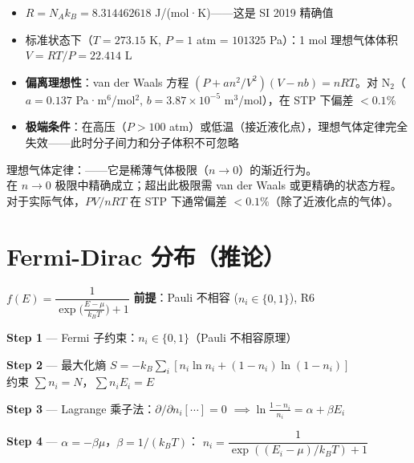 \begin{oombox}[理想气体的实际表现]
  \begin{itemize}
    \item $R = N_A k_B = 8.314462618$ J/(mol·K)——这是 SI 2019 精确值
    \item 标准状态下（$T=273.15$ K, $P=1$ atm = $101325$ Pa）：1 mol 理想气体体积 $V = RT/P = 22.414$ L
    \item \textbf{偏离理想性}：van der Waals 方程 $(P + a n^2/V^2)(V - nb) = nRT$。对 N$_2$（$a=0.137$ Pa·m$^6$/mol$^2$, $b=3.87\times10^{-5}$ m$^3$/mol），在 STP 下偏差 $<0.1\%$
    \item \textbf{极端条件}：在高压（$P > 100$ atm）或低温（接近液化点），理想气体定律完全失效——此时分子间力和分子体积不可忽略
  \end{itemize}
\end{oombox}

\precisionbox[精度等级]
  理想气体定律：\precisionapprox——它是稀薄气体极限（$n \to 0$）的渐近行为。\\
  在 $n \to 0$ 极限中精确成立；超出此极限需 van der Waals 或更精确的状态方程。\\
  对于实际气体，$PV/nRT$ 在 STP 下通常偏差 $< 0.1\%$（除了近液化点的气体）。
\endprecisionbox

\section{Fermi-Dirac 分布（推论）}

\begin{lawbox}
  $f(E) = \dfrac{1}{\exp\!\big(\frac{E-\mu}{k_B T}\big) + 1}$
  \quad\textbf{前提}：Pauli 不相容 ($n_i \in \{0,1\}$), R6
\end{lawbox}

\begin{derivationbox}[推导]
  \textbf{Step 1} — Fermi 子约束：$n_i \in \{0,1\}$（Pauli 不相容原理）

  \textbf{Step 2} — 最大化熵 $S = -k_B\sum_i[n_i\ln n_i + (1-n_i)\ln(1-n_i)]$\\
  约束 $\sum n_i = N$，$\sum n_i E_i = E$

  \textbf{Step 3} — Lagrange 乘子法：$\partial/\partial n_i[\cdots] = 0$
  $\implies \ln\frac{1-n_i}{n_i} = \alpha + \beta E_i$

  \textbf{Step 4} — $\alpha = -\beta\mu$，$\beta = 1/(k_B T)$：
  $n_i = \dfrac{1}{\exp((E_i-\mu)/k_B T) + 1}$
\end{derivationbox}

